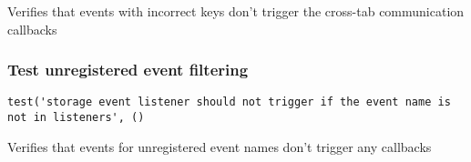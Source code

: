 \documentclass[a4paper]{article}
\begin{document}
Verifies that events with incorrect keys don't trigger
the cross-tab communication callbacks

\hypertarget{toc301}{}
\subsubsection{Test unregistered event filtering}

\begin{lstlisting}
test('storage event listener should not trigger if the event name is not in listeners', ()
\end{lstlisting}

Verifies that events for unregistered event names don't trigger
any callbacks

\end{document}
